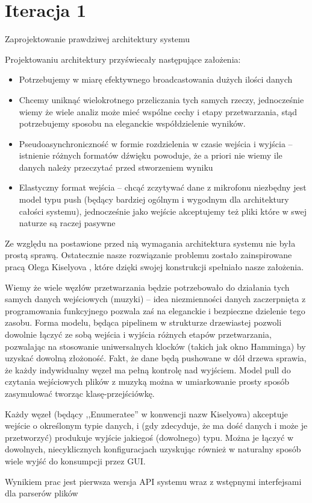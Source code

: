 \section{Iteracja 1}
\begin{Note}


Zaprojektowanie prawdziwej architektury systemu


Projektowaniu architektury przyświecały następujące założenia:
\begin{itemize}

    \item Potrzebujemy w miarę efektywnego broadcastowania dużych ilości danych
    \item Chcemy uniknąć wielokrotnego przeliczania tych samych rzeczy, jednocześnie wiemy że wiele analiz może mieć wspólne cechy i etapy przetwarzania, stąd potrzebujemy sposobu na eleganckie współdzielenie wyników.
    \item Pseudoasynchroniczność w formie rozdzielenia w czasie wejścia i wyjścia -- istnienie różnych formatów dźwięku powoduje, że a priori nie wiemy ile danych należy przeczytać przed stworzeniem wyniku
    \item Elastyczny format wejścia -- chcąć zczytywać dane z mikrofonu niezbędny jest model typu push (będący bardziej ogólnym i wygodnym dla architektury całości systemu), jednocześnie jako wejście akceptujemy też pliki które w swej naturze są raczej pasywne

\end{itemize}

Ze względu na postawione przed nią wymagania architektura systemu nie była prostą sprawą.
Ostatecznie nasze rozwiązanie problemu zostało zainspirowane pracą Olega Kiselyova \cite{kiselyov}, które dzięki swojej konstrukcji spełniało nasze założenia.

Wiemy że wiele węzłów przetwarzania będzie potrzebowało do działania tych samych danych wejściowych
(muzyki) -- idea niezmienności danych zaczerpnięta z programowania funkcyjnego pozwala zaś na eleganckie i bezpieczne dzielenie tego zasobu. Forma modelu, będąca pipelinem w strukturze drzewiastej pozwoli dowolnie łączyć ze sobą wejścia i wyjścia różnych etapów przetwarzania, pozwalając na stosowanie uniwersalnych klocków (takich jak okno Hamminga) by uzyskać dowolną złożoność. Fakt, że dane będą pushowane w dół drzewa sprawia, że każdy indywidualny węzeł ma pełną kontrolę nad wyjściem. Model pull do czytania wejściowych plików z muzyką można w umiarkowanie prosty sposób zasymulować tworząc klasę-przejściówkę.

Każdy węzeł (będący ,,Enumeratee'' w konwencji nazw Kiselyowa) akceptuje wejście o określonym typie danych, i (gdy zdecyduje, że ma dość danych i może je przetworzyć) produkuje wyjście jakiegoś (dowolnego) typu. Można je łączyć w dowolnych, niecyklicznych konfiguracjach uzyskując również w naturalny sposób wiele wyjść do konsumpcji przez GUI.

Wynikiem prac jest pierwsza wersja API systemu wraz z wstępnymi interfejsami dla parserów plików

\end{Note}


